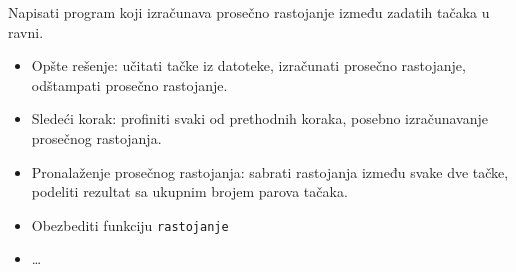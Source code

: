 \documentclass[../main.tex]{subfiles}
\begin{document}
\begin{boxprimer}
Napisati program koji izračunava prosečno rastojanje između zadatih tačaka u ravni.
\begin{itemize}
\item Opšte rešenje: učitati tačke iz datoteke, izračunati prosečno rastojanje, odštampati prosečno rastojanje.
\item Sledeći korak: profiniti svaki od prethodnih koraka, posebno izračunavanje prosečnog rastojanja.
\item Pronalaženje prosečnog rastojanja: sabrati rastojanja između svake dve tačke, podeliti rezultat sa ukupnim brojem parova tačaka.
\item Obezbediti funkciju \texttt{rastojanje}
\item \ldots
\end{itemize}

\end{boxprimer}
\end{document}
